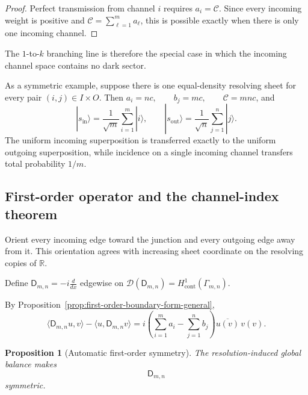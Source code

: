 \documentclass[11pt]{article}
\theoremstyle{plain}
\newtheorem{proposition}[theorem]{Proposition}
\theoremstyle{definition}
\begin{document}
\begin{proof}
Perfect transmission from channel \(i\) requires
\(a_i=\mathcal C\).
Since every incoming weight is positive and
\(\mathcal C=\sum_{\ell=1}^{m}a_\ell\),
this is possible exactly when there is only one incoming channel.
\end{proof}

The \(1\)-to-\(k\) branching line is therefore the special case in which
the incoming channel space contains no dark sector.

As a symmetric example, suppose there is one equal-density resolving sheet
for every pair
\((i,j)\in I\times O\).
Then
\(a_i=nc, \qquad b_j=mc, \qquad \mathcal C=mnc\),
and
\[
  |s_{\mathrm{in}}\rangle
  =
  \frac1{\sqrt m}
  \sum_{i=1}^{m}|i\rangle,
  \qquad
  |s_{\mathrm{out}}\rangle
  =
  \frac1{\sqrt n}
  \sum_{j=1}^{n}|j\rangle.
\]
The uniform incoming superposition is transferred exactly to the uniform
outgoing superposition, while incidence on a single incoming channel
transfers total probability \(1/m\).

\subsection{First-order operator and the channel-index theorem}
\label{subsec:Bmn-first-order}
\label{subsec:Bmn-adjoint}
\label{subsec:Bmn-deficiency}
\label{subsec:Bmn-SA}
\label{subsec:Bmn-dark-deficiency}
\label{subsec:Bmn-orientation-reversal}
\label{subsec:Bmn-Bk-comparison}
\label{subsec:Bmn-interpretation}

Orient every incoming edge toward the junction and every outgoing edge away
from it. This orientation agrees with increasing sheet coordinate on the
resolving copies of \(\mathbb R\).

Define \(\mathsf D_{m,n} = -i\frac{d}{dx}\) edgewise on
\(\mathcal D(\mathsf D_{m,n}) = H^1_{\mathrm{cont}}(\Gamma_{m,n})\).

By Proposition~\ref{prop:first-order-boundary-form-general},
\[
  \langle\mathsf D_{m,n}u,v\rangle
  -
  \langle u,\mathsf D_{m,n}v\rangle
  =
  i
  \left(
    \sum_{i=1}^{m}a_i
    -
    \sum_{j=1}^{n}b_j
  \right)
  \overline{u(v)}\,v(v).
\]

\begin{proposition}[Automatic first-order symmetry]
\label{prop:Bmn-first-order-symmetry}
The resolution-induced global balance makes
\[
  \mathsf D_{m,n}
\]
symmetric.
\end{proposition}
\end{document}
